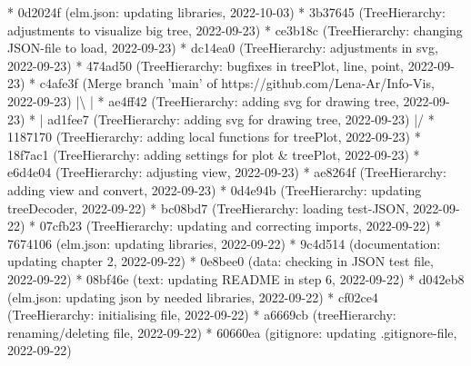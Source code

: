 \documentclass[usegeometry=true]{scrartcl}
\begin{document}
* 0d2024f (elm.json:  updating libraries, 2022-10-03)\newline
* 3b37645 (TreeHierarchy: adjustments to visualize big tree, 2022-09-23) \newline
* ce3b18c (TreeHierarchy: changing JSON-file to load, 2022-09-23)\newline
* dc14ea0 (TreeHierarchy: adjustments in svg, 2022-09-23)\newline
* 474ad50 (TreeHierarchy: bugfixes in treePlot, line, point, 2022-09-23)\newline
*   c4afe3f (Merge branch 'main' of https://github.com/Lena-Ar/Info-Vis, 2022-09-23)\newline
|\textbackslash \newline  
| * ae4ff42 (TreeHierarchy: adding svg for drawing tree, 2022-09-23)\newline
* | ad1fee7 (TreeHierarchy: adding svg for drawing tree, 2022-09-23)\newline
|/  \newline
* 1187170 (TreeHierarchy: adding local functions for treePlot, 2022-09-23)\newline
* 18f7ac1 (TreeHierarchy: adding settings for plot \& treePlot, 2022-09-23)\newline
* e6d4e04 (TreeHierarchy: adjusting view, 2022-09-23)\newline
* ae8264f (TreeHierarchy: adding view and convert, 2022-09-23)\newline
* 0d4e94b (TreeHierarchy: updating treeDecoder, 2022-09-22)\newline
* bc08bd7 (TreeHierarchy: loading test-JSON, 2022-09-22) \newline
* 07cfb23 (TreeHierarchy: updating and correcting imports, 2022-09-22) \newline
* 7674106 (elm.json: updating libraries, 2022-09-22)\newline
* 9c4d514 (documentation: updating chapter 2, 2022-09-22)\newline
* 0e8bee0 (data: checking in JSON test file, 2022-09-22)\newline
* 08bf46e (text: updating README in step 6, 2022-09-22)\newline
* d042eb8 (elm.json: updating json by needed libraries, 2022-09-22)\newline
* cf02ce4 (TreeHierarchy: initialising file, 2022-09-22)\newline
* a6669cb (treeHierarchy: renaming/deleting file, 2022-09-22)\newline
* 60660ea (gitignore: updating .gitignore-file, 2022-09-22)\newline
\end{document}
